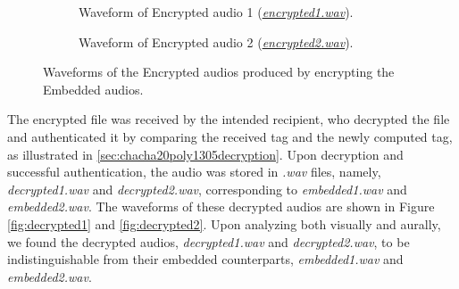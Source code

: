 \documentclass[a4paper]{cas-sc}
\begin{document}
\begin{figure}[pos=h]
    \begin{subfigure}[h]{0.45\textwidth}
        \begin{center}
            
            \caption{Waveform of Encrypted audio 1 (\href{https://drive.google.com/file/d/1fyl3awT4OiCKDLbgOBVyJiQFywCXubHJ/view?usp=drive_link}{\textit{encrypted1.wav}}).}
            \label{fig:encrypted1}
        \end{center}
    \end{subfigure}
    \hfill
    \begin{subfigure}[h]{0.45\textwidth}
        \begin{center}
            
            \caption{Waveform of Encrypted audio 2 (\href{https://drive.google.com/file/d/13Yfz3mYeFxycPza1hi8XbAg1jy4cI5Wr/view?usp=drive_link}{\textit{encrypted2.wav}}).}
            \label{fig:encrypted2}
        \end{center}
    \end{subfigure}
    \caption{Waveforms of the Encrypted audios produced by encrypting the Embedded audios.}
\end{figure}

The encrypted file was received by the intended recipient, who decrypted the file and authenticated it by comparing the received tag and the newly computed tag, as illustrated in \ref{sec:chacha20poly1305decryption}. Upon decryption and successful authentication, the audio was stored in \textit{.wav} files, namely, \textit{decrypted1.wav} and \textit{decrypted2.wav}, corresponding to \textit{embedded1.wav} and \textit{embedded2.wav}. The waveforms of these decrypted audios are shown in Figure \ref{fig:decrypted1} and \ref{fig:decrypted2}. Upon analyzing both visually and aurally, we found the decrypted audios, \textit{decrypted1.wav} and \textit{decrypted2.wav}, to be indistinguishable from their embedded counterparts, \textit{embedded1.wav} and \textit{embedded2.wav}.
\end{document}

